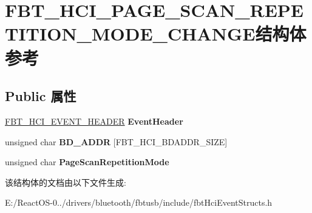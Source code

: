 \hypertarget{struct_f_b_t___h_c_i___p_a_g_e___s_c_a_n___r_e_p_e_t_i_t_i_o_n___m_o_d_e___c_h_a_n_g_e}{}\section{F\+B\+T\+\_\+\+H\+C\+I\+\_\+\+P\+A\+G\+E\+\_\+\+S\+C\+A\+N\+\_\+\+R\+E\+P\+E\+T\+I\+T\+I\+O\+N\+\_\+\+M\+O\+D\+E\+\_\+\+C\+H\+A\+N\+G\+E结构体 参考}
\label{struct_f_b_t___h_c_i___p_a_g_e___s_c_a_n___r_e_p_e_t_i_t_i_o_n___m_o_d_e___c_h_a_n_g_e}
\subsection*{Public 属性}
\begin{DoxyCompactItemize}
\item 
\mbox{\label{struct_f_b_t___h_c_i___p_a_g_e___s_c_a_n___r_e_p_e_t_i_t_i_o_n___m_o_d_e___c_h_a_n_g_e_a4a116feefda314a91a0f1474ef347f95}} 
\hyperlink{struct_f_b_t___h_c_i___e_v_e_n_t___h_e_a_d_e_r}{F\+B\+T\+\_\+\+H\+C\+I\+\_\+\+E\+V\+E\+N\+T\+\_\+\+H\+E\+A\+D\+ER} {\bfseries Event\+Header}
\item 
\mbox{\label{struct_f_b_t___h_c_i___p_a_g_e___s_c_a_n___r_e_p_e_t_i_t_i_o_n___m_o_d_e___c_h_a_n_g_e_a195c1d6769d3f1690c302d9b9509df1c}} 
unsigned char {\bfseries B\+D\+\_\+\+A\+D\+DR} \mbox{[}F\+B\+T\+\_\+\+H\+C\+I\+\_\+\+B\+D\+A\+D\+D\+R\+\_\+\+S\+I\+ZE\mbox{]}
\item 
\mbox{\label{struct_f_b_t___h_c_i___p_a_g_e___s_c_a_n___r_e_p_e_t_i_t_i_o_n___m_o_d_e___c_h_a_n_g_e_a7e3da62979ddf22a6e9ee93bd01402c5}} 
unsigned char {\bfseries Page\+Scan\+Repetition\+Mode}
\end{DoxyCompactItemize}


该结构体的文档由以下文件生成\+:\begin{DoxyCompactItemize}
\item 
E\+:/\+React\+O\+S-\/0../drivers/bluetooth/fbtusb/include/fbt\+Hci\+Event\+Structs.\+h\end{DoxyCompactItemize}
